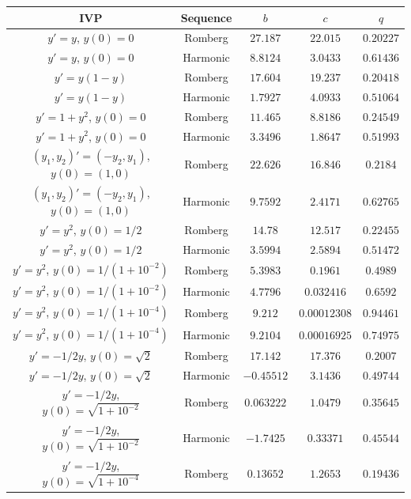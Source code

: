 \begin{table}[H]
    \centering
    \begin{tabular}{c|c||c|c|c}
           IVP & Sequence & \(b\) & \(c\) & \(q\) \\\hline\hline
$y'=y$, $y(0) = 0$ & Romberg & \(27.187\) & \(22.015\) & \(0.20227\) \\
$y'=y$, $y(0) = 0$ & Harmonic & \(8.8124\) & \(3.0433\) & \(0.61436\) \\
$y' = y(1-y)$ & Romberg & \(17.604\) & \(19.237\) & \(0.20418\) \\
$y' = y(1-y)$ & Harmonic & \(1.7927\) & \(4.0933\) & \(0.51064\) \\
$y' = 1 + y^2$, $y(0) = 0$ & Romberg & \(11.465\) & \(8.8186\) & \(0.24549\) \\
$y' = 1 + y^2$, $y(0) = 0$ & Harmonic & \(3.3496\) & \(1.8647\) & \(0.51993\) \\
$(y_1,y_2)' = (-y_2,y_1)$, $y(0) = (1,0)$ & Romberg & \(22.626\) & \(16.846\) & \(0.2184\) \\
$(y_1,y_2)' = (-y_2,y_1)$, $y(0) = (1,0)$ & Harmonic & \(9.7592\) & \(2.4171\) & \(0.62765\) \\
$y' = y^2$, $y(0) = 1/2$ & Romberg & \(14.78\) & \(12.517\) & \(0.22455\) \\
$y' = y^2$, $y(0) = 1/2$ & Harmonic & \(3.5994\) & \(2.5894\) & \(0.51472\) \\
$y'=y^2$, $y(0) = 1/(1+10^{-2})$ & Romberg & \(5.3983\) & \(0.1961\) & \(0.4989\) \\
$y'=y^2$, $y(0) = 1/(1+10^{-2})$ & Harmonic & \(4.7796\) & \(0.032416\) & \(0.6592\) \\
$y'=y^2$, $y(0) = 1/(1+10^{-4})$ & Romberg & \(9.212\) & \(0.00012308\) & \(0.94461\) \\
$y'=y^2$, $y(0) = 1/(1+10^{-4})$ & Harmonic & \(9.2104\) & \(0.00016925\) & \(0.74975\) \\
$y' = -1/2y$, $y(0) = \sqrt{2}$ & Romberg & \(17.142\) & \(17.376\) & \(0.2007\) \\
$y' = -1/2y$, $y(0) = \sqrt{2}$ & Harmonic & \(-0.45512\) & \(3.1436\) & \(0.49744\) \\
$y' = -1/2y$, $y(0) = \sqrt{1+10^{-2}}$ & Romberg & \(0.063222\) & \(1.0479\) & \(0.35645\) \\
$y' = -1/2y$, $y(0) = \sqrt{1+10^{-2}}$ & Harmonic & \(-1.7425\) & \(0.33371\) & \(0.45544\) \\
$y' = -1/2y$, $y(0) = \sqrt{1+10^{-4}}$ & Romberg & \(0.13652\) & \(1.2653\) & \(0.19436\) \\

\end{tabular}
\end{table}
